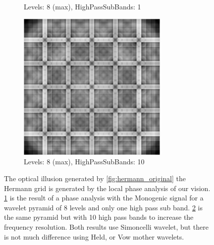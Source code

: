 \begin{figure}[H]
\begin{subfigure}[t]{.4\textwidth}
    \captionsetup{width=\textwidth}
    \caption{Levels: 8 (max), HighPassSubBands: 1}
    \label{fig:hermann_8_1}
  \end{subfigure}%
  \begin{subfigure}[t]{.4\textwidth}
    \centering
    \includegraphics[width=0.8\textwidth]{Figures/chapter-wavelets/images/phaseImages/hermann_simoncelli_8_10.png}
    \captionsetup{width=\textwidth}
    \caption{Levels: 8 (max), HighPassSubBands: 10}
    \label{fig:hermann_8_10}
  \end{subfigure}
  \caption{The optical illusion generated by \ref{fig:hermann_original} the Hermann grid is generated by the local phase analysis of our vision. \ref{fig:hermann_8_1} is the result of a phase analysis with the Monogenic signal for a wavelet pyramid of 8 levels and only one high pass sub band. \ref{fig:hermann_8_10} is the same pyramid but with 10 high pass bands to increase the frequency resolution. Both results use Simoncelli wavelet, but there is not much difference using Held, or Vow mother wavelets.}
  \label{fig:phase_hermann}
\end{figure}

